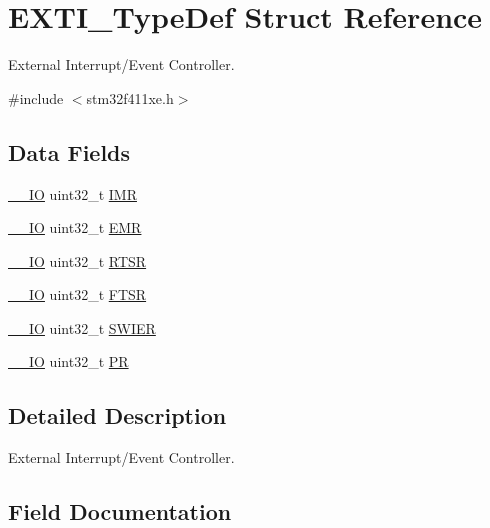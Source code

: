 \hypertarget{struct_e_x_t_i___type_def}{}\section{E\+X\+T\+I\+\_\+\+Type\+Def Struct Reference}
\label{struct_e_x_t_i___type_def}


External Interrupt/\+Event Controller.  




{\ttfamily \#include $<$stm32f411xe.\+h$>$}

\subsection*{Data Fields}
\begin{DoxyCompactItemize}
\item 
\hyperlink{core__sc300_8h_aec43007d9998a0a0e01faede4133d6be}{\+\_\+\+\_\+\+IO} uint32\+\_\+t \hyperlink{struct_e_x_t_i___type_def_a17d061db586d4a5aa646b68495a8e6a4}{I\+MR}
\item 
\hyperlink{core__sc300_8h_aec43007d9998a0a0e01faede4133d6be}{\+\_\+\+\_\+\+IO} uint32\+\_\+t \hyperlink{struct_e_x_t_i___type_def_a9c5bff67bf9499933959df7eb91a1bd6}{E\+MR}
\item 
\hyperlink{core__sc300_8h_aec43007d9998a0a0e01faede4133d6be}{\+\_\+\+\_\+\+IO} uint32\+\_\+t \hyperlink{struct_e_x_t_i___type_def_ac019d211d8c880b327a1b90a06cc0675}{R\+T\+SR}
\item 
\hyperlink{core__sc300_8h_aec43007d9998a0a0e01faede4133d6be}{\+\_\+\+\_\+\+IO} uint32\+\_\+t \hyperlink{struct_e_x_t_i___type_def_aee667dc148250bbf37fdc66dc4a9874d}{F\+T\+SR}
\item 
\hyperlink{core__sc300_8h_aec43007d9998a0a0e01faede4133d6be}{\+\_\+\+\_\+\+IO} uint32\+\_\+t \hyperlink{struct_e_x_t_i___type_def_a5c1f538e64ee90918cd158b808f5d4de}{S\+W\+I\+ER}
\item 
\hyperlink{core__sc300_8h_aec43007d9998a0a0e01faede4133d6be}{\+\_\+\+\_\+\+IO} uint32\+\_\+t \hyperlink{struct_e_x_t_i___type_def_a133294b87dbe6a01e8d9584338abc39a}{PR}
\end{DoxyCompactItemize}


\subsection{Detailed Description}
External Interrupt/\+Event Controller. 

\subsection{Field Documentation}
\mbox{\label{struct_e_x_t_i___type_def_a9c5bff67bf9499933959df7eb91a1bd6}} 
